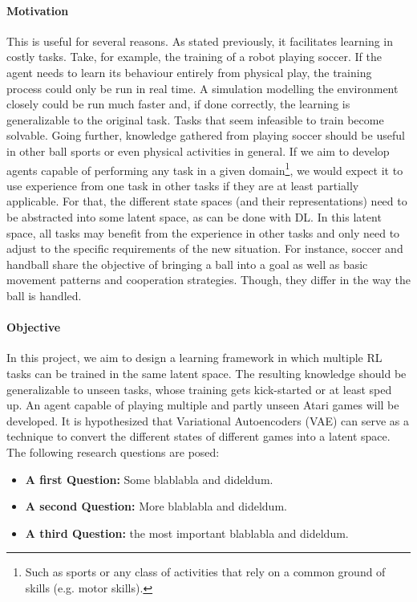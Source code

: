 \paragraph{Motivation} This is useful for several reasons. As stated previously, it facilitates learning in costly tasks. Take, for example, the training of a robot playing soccer. If the agent needs to learn its behaviour entirely from physical play, the training process could only be run in real time. A simulation modelling the environment closely could be run much faster and, if done correctly, the learning is generalizable to the original task. Tasks that seem infeasible to train become solvable. Going further, knowledge gathered from playing soccer should be useful in other ball sports or even physical activities in general. If we aim to develop agents capable of performing any task in a given domain\footnote{Such as sports or any class of activities that rely on a common ground of skills (e.g. motor skills).}, we would expect it to use experience from one task in other tasks if they are at least partially applicable. For that, the different state spaces (and their representations) need to be abstracted into some latent space, as can be done with DL. In this latent space, all tasks may benefit from the experience in other tasks and only need to adjust to the specific requirements of the new situation. For instance, soccer and handball share the objective of bringing a ball into a goal as well as basic movement patterns and cooperation strategies. Though, they differ in the way the ball is handled.

\paragraph{Objective} In this project, we aim to design a learning framework in which multiple RL tasks can be trained in the same latent space. The resulting knowledge should be generalizable to unseen tasks, whose training gets kick-started or at least sped up. An agent capable of playing multiple and partly unseen Atari games will be developed. It is hypothesized that Variational Autoencoders (VAE) can serve as a technique to convert the different states of different games into a latent space. The following research questions are posed:

\begin{itemize}

	\item \textbf{A first Question:} Some blablabla and dideldum.
	
	\item \textbf{A second Question:} More blablabla and dideldum.
	
	\item \textbf{A third Question:} the most important blablabla and dideldum.

\end{itemize}

